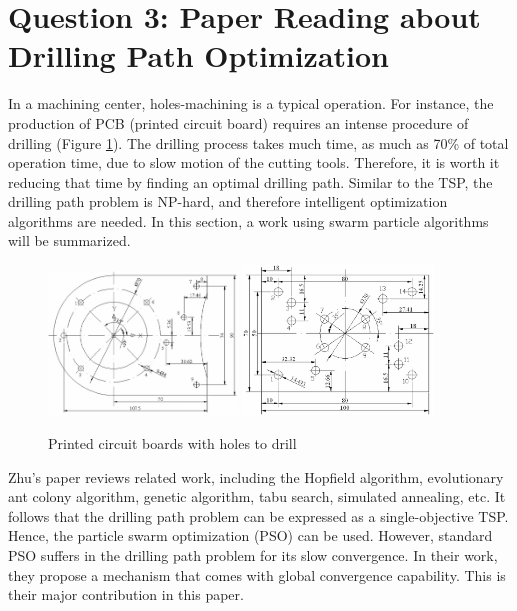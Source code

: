 \documentclass{IEEEtran}
\begin{document}
\section{Question 3: Paper Reading about Drilling Path Optimization}
{
    In a machining center, holes-machining is a typical operation. 
    For instance, the production of PCB (printed circuit board) requires an intense procedure of drilling (Figure \ref{fig:drillings}).
    The drilling process takes much time, as much as 70\% of total operation time, due to slow motion of the cutting tools. \cite{zhu2008drilling}
    Therefore, it is worth it reducing that time by finding an optimal drilling path.
    Similar to the TSP, the drilling path problem is NP-hard, and therefore intelligent optimization algorithms are needed.
    In this section, a work using swarm particle algorithms \cite{zhu2008drilling} will be summarized.
    \begin{figure}[!htbp]
        \centering
        \includegraphics[width=0.45\textwidth]{figures/drilling_1.png}
        \includegraphics[width=0.45\textwidth]{figures/drilling_2.png}
        \caption{Printed circuit boards with holes to drill \cite{zhu2008drilling}}
        \label{fig:drillings}
    \end{figure}

    Zhu's paper reviews related work, including the Hopfield algorithm, evolutionary ant colony algorithm, genetic algorithm, tabu search, simulated annealing, etc.
    It follows that the drilling path problem can be expressed as a single-objective TSP.
    Hence, the particle swarm optimization (PSO) can be used.
    However, standard PSO suffers in the drilling path problem for its slow convergence.
    In their work, they propose a mechanism that comes with global convergence capability.
    This is their major contribution in this paper. 

}
\end{document}
